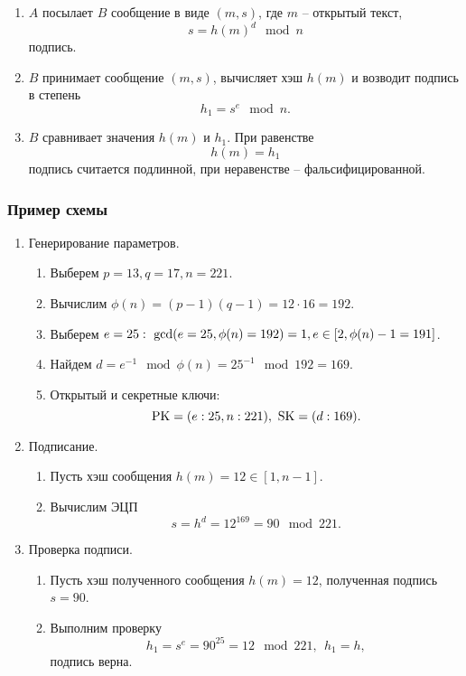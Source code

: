 \begin{enumerate}
    \item $A$ посылает $B$ сообщение в виде $(m, s)$, где $m$ -- открытый текст,
        \[ s = h(m)^d \mod n \]
        подпись.
    \item $B$ принимает сообщение $(m, s)$, вычисляет хэш $h(m)$ и возводит подпись в степень
        \[ h_1 = s^e \mod n. \]
    \item $B$ сравнивает значения $h(m)$ и $h_1$. При равенстве
        \[ h(m) = h_1 \]
        подпись считается подлинной, при неравенстве -- фальсифицированной.
\end{enumerate}


\subsubsection{Пример схемы}

\begin{enumerate}
    \item Генерирование параметров.
        \begin{enumerate}
            \item Выберем $p=13, q=17, n = 221$.
            \item Вычислим $\phi(n) = (p-1)(q-1) = 12 \cdot 16 = 192$.
            \item Выберем $e=25: ~ \gcd(e = 25, \phi(n) = 192) = 1, \\
                e \in [2, \phi(n) - 1 = 191]$.
            \item Найдем $d = e^{-1} \mod \phi(n) = 25^{-1} \mod 192 = 169$.
            \item Открытый и секретные ключи:
                \[ \textrm{PK} = (e:25, n:221), ~ \textrm{SK} = (d:169). \]
        \end{enumerate}
    \item Подписание.
        \begin{enumerate}
            \item Пусть хэш сообщения $h(m) = 12 \in [1, n-1]$.
            \item Вычислим ЭЦП
                \[ s = h^d = 12^{169} = 90 \mod 221. \]
        \end{enumerate}
    \item Проверка подписи.
        \begin{enumerate}
            \item Пусть хэш полученного сообщения $h(m) = 12$, полученная подпись $s = 90$.
            \item Выполним проверку
                \[ h_1 = s^e = 90^{25} = 12 \mod 221, ~~ h_1 = h, \]
                подпись верна.
        \end{enumerate}
\end{enumerate}


